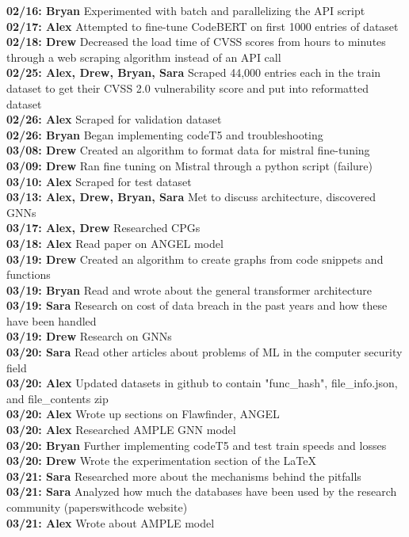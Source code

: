 \documentclass{article}
\begin{document}
\textbf{02/16: Bryan} Experimented with batch and parallelizing the API script \\
\textbf{02/17: Alex} Attempted to fine-tune CodeBERT on first 1000 entries of dataset \\
\textbf{02/18: Drew} Decreased the load time of CVSS scores from hours to minutes through a web scraping algorithm instead of an API call \\
\textbf{02/25: Alex, Drew, Bryan, Sara} Scraped 44,000 entries each in the train dataset to get their CVSS 2.0 vulnerability score and put into reformatted dataset \\
\textbf{02/26: Alex} Scraped for validation dataset \\
\textbf{02/26: Bryan} Began implementing codeT5 and troubleshooting \\
\textbf{03/08: Drew} Created an algorithm to format data for mistral fine-tuning \\
\textbf{03/09: Drew} Ran fine tuning on Mistral through a python script (failure) \\
\textbf{03/10: Alex} Scraped for test dataset \\
\textbf{03/13: Alex, Drew, Bryan, Sara} Met to discuss architecture, discovered GNNs \\
\textbf{03/17: Alex, Drew} Researched CPGs \\
\textbf{03/18: Alex} Read paper on ANGEL model \\
\textbf{03/19: Drew} Created an algorithm to create graphs from code snippets and functions \\
\textbf{03/19: Bryan} Read and wrote about the general transformer architecture \\
\textbf{03/19: Sara} Research on cost of data breach in the past years and how these have been handled \\
\textbf{03/19: Drew} Research on GNNs \\
\textbf{03/20: Sara} Read other articles about problems of ML in the computer security field \\
\textbf{03/20: Alex} Updated datasets in github to contain "func\_hash", file\_info.json, and file\_contents zip \\
\textbf{03/20: Alex} Wrote up sections on Flawfinder, ANGEL \\
\textbf{03/20: Alex} Researched AMPLE GNN model \\
\textbf{03/20: Bryan} Further implementing codeT5 and test train speeds and losses \\
\textbf{03/20: Drew} Wrote the experimentation section of the LaTeX \\
\textbf{03/21: Sara} Researched more about the mechanisms behind the pitfalls \\
\textbf{03/21: Sara} Analyzed how much the databases have been used by the research community (paperswithcode website) \\
\textbf{03/21: Alex} Wrote about AMPLE model \\
      

\end{document}
